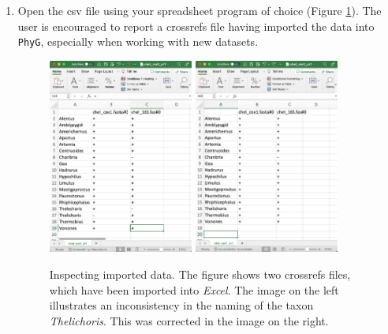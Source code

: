 \documentclass[]{article}
\begin{document}
\begin{enumerate}
\item Open the csv file using  your spreadsheet program of choice (Figure \ref{crossrefs}). 
The user is encouraged to report a crossrefs file having imported the data 
into \texttt{PhyG}, especially when working with new datasets. 

\begin{figure}
\centering
\includegraphics[width=0.45\textwidth]{crossrefs1.png}\hfill
\includegraphics[width=0.45\textwidth]{crossrefs2.png}
\caption{Inspecting imported data. The figure shows two crossrefs files, which have 
been imported into \textit{Excel}. The image on the left illustrates an inconsistency in the 
naming of the taxon \textit{Thelichoris}. This was corrected in the image on the right.}
\label{crossrefs}
\end{figure}
	

\end{enumerate}
\end{document}
